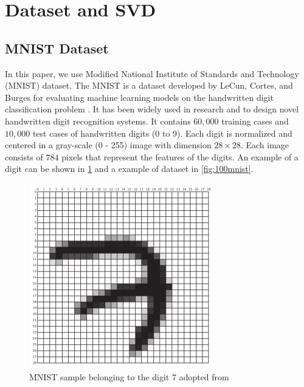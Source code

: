 \documentclass[conference]{IEEEtran}
\begin{document}
\section{Dataset and SVD}

\subsection{MNIST Dataset}
In this paper, we use Modified National Institute of Standards and Technology (MNIST) dataset. 
The MNIST is a dataset developed by LeCun, Cortes, and Burges for evaluating machine learning models on the handwritten digit classification problem \cite{lenet-5}. 
It has been widely used in research and to design novel handwritten digit recognition systems. 
It contains $60,000$ training cases and $10,000$ test cases of handwritten digits (0 to 9). 
Each digit is normalized and centered in a gray-scale (0 - 255) image with dimension $28 \times 28$. 
Each image consists of $784$ pixels that represent the features of the digits. An example of a digit can be shown in \ref{fig:sevenMNIST} and a example of dataset in \ref{fig:100mnist}. 

\begin{figure}[htbp]
    \centerline{\includegraphics[width=8cm]{detail7.png}}
    \caption{MNIST sample belonging to the digit 7 adopted from \protect\cite{baldominos2019survey}}
    \label{fig:sevenMNIST}
\end{figure}
\end{document}
